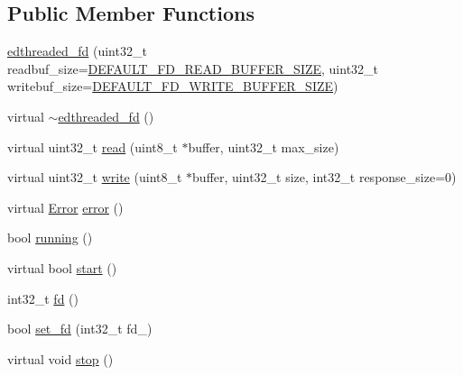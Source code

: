 \subsection*{Public Member Functions}
\begin{DoxyCompactItemize}
\item 
\hyperlink{classedthreaded__fd_aae0e03e726a962766ada1a053e426dfc}{edthreaded\-\_\-fd} (uint32\-\_\-t readbuf\-\_\-size=\hyperlink{edthreaded__fd_8h_a645b973029e4897854f96c850e30eaa3}{D\-E\-F\-A\-U\-L\-T\-\_\-\-F\-D\-\_\-\-R\-E\-A\-D\-\_\-\-B\-U\-F\-F\-E\-R\-\_\-\-S\-I\-Z\-E}, uint32\-\_\-t writebuf\-\_\-size=\hyperlink{edthreaded__fd_8h_a342873b4069f62ee07236e149ab6471b}{D\-E\-F\-A\-U\-L\-T\-\_\-\-F\-D\-\_\-\-W\-R\-I\-T\-E\-\_\-\-B\-U\-F\-F\-E\-R\-\_\-\-S\-I\-Z\-E})
\item 
virtual \hyperlink{classedthreaded__fd_a6f9a9d65186740a24d9bd3f164034e39}{$\sim$edthreaded\-\_\-fd} ()
\item 
virtual uint32\-\_\-t \hyperlink{classedthreaded__fd_a8f5b6c664a8fe5df737222e225f1fd19}{read} (uint8\-\_\-t $\ast$buffer, uint32\-\_\-t max\-\_\-size)
\item 
virtual uint32\-\_\-t \hyperlink{classedthreaded__fd_a69c6badd6cf1a9a635d670d2afec80d3}{write} (uint8\-\_\-t $\ast$buffer, uint32\-\_\-t size, int32\-\_\-t response\-\_\-size=0)
\item 
virtual \hyperlink{structedthreaded__fd_1_1Error}{Error} \hyperlink{classedthreaded__fd_a3708a6fecec91ca541a1c1c834bec7dd}{error} ()
\item 
bool \hyperlink{classedthreaded__fd_a55493d7c23181335e8412e2e7874795b}{running} ()
\item 
virtual bool \hyperlink{classedthreaded__fd_ac8123803d831c671b9b62881697e69e0}{start} ()
\item 
int32\-\_\-t \hyperlink{classedthreaded__fd_a4b4e4f3c1e8c0a4fd5389bcb8690ef08}{fd} ()
\item 
bool \hyperlink{classedthreaded__fd_aadead96bf63b16f95c48c7a863323b0e}{set\-\_\-fd} (int32\-\_\-t fd\-\_\-)
\item 
virtual void \hyperlink{classedthreaded__fd_a92a9a1f5b8df83c5697033822f1134b8}{stop} ()
\end{DoxyCompactItemize}
